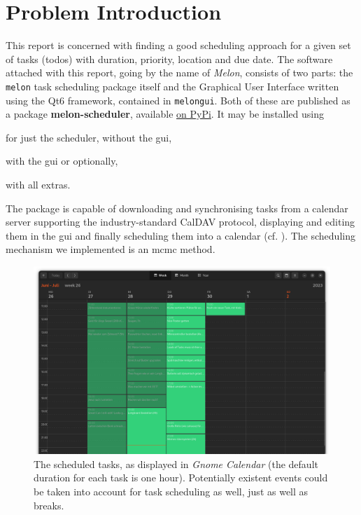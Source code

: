 \section{Problem Introduction}
\label{sec:introduction}

This report is concerned with finding a good scheduling approach for a given set of tasks (todos) with duration, priority, location and due date.
The software attached with this report, going by the name of \textit{Melon}, consists of two parts: the \texttt{melon} task scheduling package itself and the Graphical User Interface written using the Qt6 framework, contained in \texttt{melongui}.
Both of these are published as a package \textbf{melon-scheduler}, available \href{https://pypi.org/project/melon-scheduler/}{on PyPi}. It may be installed using

for just the scheduler, without the \gls{gui},

 with the \gls{gui} or optionally,

 with all extras.

The package is capable of downloading and synchronising tasks from a calendar server supporting the industry-standard CalDAV protocol, displaying and editing them in the \gls{gui} and finally scheduling them into a calendar (cf. ).
The scheduling mechanism we implemented is an \gls{mcmc} method.

\begin{figure}[H]
  \centering
  \includegraphics[width=\linewidth]{figures/exported-calendar.png}
  \caption{The scheduled tasks, as displayed in \textit{Gnome Calendar} (the default duration for each task is one hour). Potentially existent events could be taken into account for task scheduling as well, just as well as breaks.}
  \label{fig:calendar}
\end{figure}

